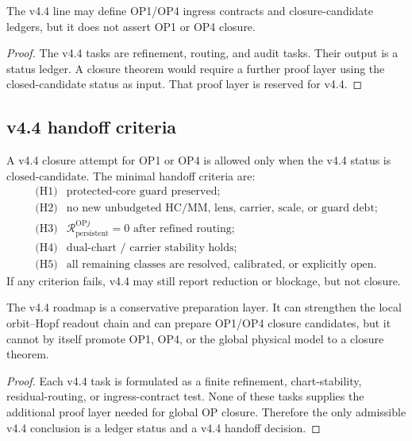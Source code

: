 \begin{proposition}
\label{prop:v44-no-op-closure-claim}
The v4.4 line may define OP1/OP4 ingress contracts and closure-candidate
ledgers, but it does not assert OP1 or OP4 closure.
\end{proposition}

\begin{proof}
The v4.4 tasks are refinement, routing, and audit tasks.  Their output is a
status ledger.  A closure theorem would require a further proof layer using the
closed-candidate status as input.  That proof layer is reserved for v4.4.
\end{proof}

\subsection{v4.4 handoff criteria}
\label{subsec:v45-handoff-criteria}

A v4.4 closure attempt for OP1 or OP4 is allowed only when the v4.4 status is
\(\mathrm{closed\text{-}candidate}\).  The minimal handoff criteria are:
\[
\begin{array}{ll}
\text{(H1)} & \text{protected-core guard preserved;}\\
\text{(H2)} & \text{no new unbudgeted HC/MM, lens, carrier, scale, or guard debt;}\\
\text{(H3)} & \mathcal R_{\mathrm{persistent}}^{\mathrm{OP}j}=0
              \text{ after refined routing;}\\
\text{(H4)} & \text{dual-chart / carrier stability holds;}\\
\text{(H5)} & \text{all remaining classes are resolved, calibrated, or explicitly open.}
\end{array}
\]
If any criterion fails, v4.4 may still report reduction or blockage, but not
closure.

\begin{theorem}
\label{thm:v44-roadmap-guard}
The v4.4 roadmap is a conservative preparation layer.  It can strengthen the
local orbit--Hopf readout chain and can prepare OP1/OP4 closure candidates, but
it cannot by itself promote OP1, OP4, or the global physical model to a closure
theorem.
\end{theorem}

\begin{proof}
Each v4.4 task is formulated as a finite refinement, chart-stability,
residual-routing, or ingress-contract test.  None of these tasks supplies the
additional proof layer needed for global OP closure.  Therefore the only
admissible v4.4 conclusion is a ledger status and a v4.4 handoff decision.
\end{proof}


